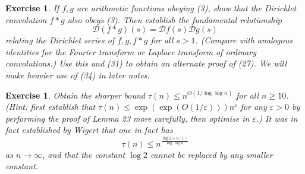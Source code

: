 \documentclass[10pt,reqno]{amsart}
\newtheorem{exercise}[theorem]{Exercise}
\begin{document}
\begin{exercise}    
    If $f, g$ are arithmetic functions obeying (3), show that the Dirichlet convolution $f*g$ also obeys (3). Then establish the fundamental relationship
    \begin{equation}   {\mathcal D}(f*g)(s) = {\mathcal D} f(s) {\mathcal D}g(s) \end{equation}
    relating the Dirichlet series of $f,g,f*g$ for all $s>1$. (Compare with analogous identities for the Fourier transform or Laplace transform of ordinary convolutions.) Use this and (31) to obtain an alternate proof of (27). We will make heavier use of (34) in later notes.
\end{exercise}

\begin{exercise}
    Obtain the sharper bound $\tau(n) \leq n^{O(1 / \log\log n )}$ for all $n \geq 10$. (Hint: first establish that $\tau(n) \leq \exp(\exp(O(1/\varepsilon))) n^\varepsilon$ for any $\varepsilon > 0$ by performing the proof of Lemma 23 more carefully, then optimise in $\varepsilon$.) It was in fact established by Wigert that one in fact has
    \[ \tau(n) \leq n^{\frac{\log 2+o(1)}{\log\log n}} \]
    as $n \rightarrow \infty$, and that the constant $\log 2$ cannot be replaced by any smaller constant.
\end{exercise}
\end{document}
